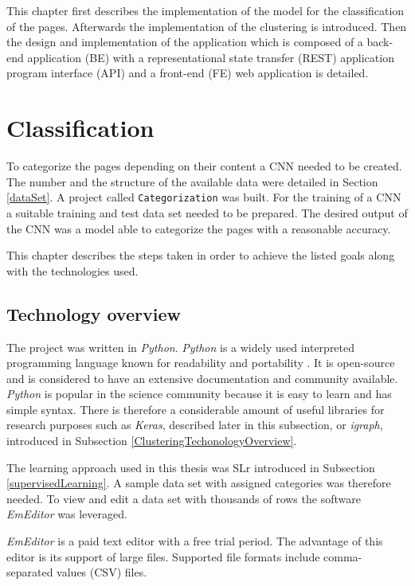 This chapter first describes the implementation of the model for the classification of the pages. Afterwards the implementation of the clustering is introduced. Then the design and implementation of the application which is composed of a back-end application (BE) with a representational state transfer (REST) application program interface (API) and a front-end (FE) web application is detailed. 

\section{Classification} \label{ClassificationDevelopment}
To categorize the pages depending on their content a CNN needed to be created. The number and the structure of the available data were detailed in Section \ref{dataSet}. A project called \texttt{Categorization} was built. For the training of a CNN a suitable training and test data set needed to be prepared. The desired output of the CNN was a model able to categorize the pages with a reasonable accuracy. 

This chapter describes the steps taken in order to achieve the listed goals along with the technologies used.

\subsection{Technology overview} \label{ClassificationTechonologyOverview}
The project was written in \textit{Python}. \textit{Python} is a widely used interpreted programming language known for readability and portability \cite{aboutPython}. It is open-source and is considered to have an extensive documentation and community available. \textit{Python} is popular in the science community because it is easy to learn and has simple syntax. There is therefore a considerable amount of useful libraries for research purposes such as \textit{Keras}, described later in this subsection, or \textit{igraph}, introduced in Subsection \ref{ClusteringTechonologyOverview}.  

The learning approach used in this thesis was SLr introduced in Subsection \ref{supervisedLearning}. A sample data set with assigned categories was therefore needed. To view and edit a data set with thousands of rows the software \textit{EmEditor} \cite{emeditor} was leveraged. 

\textit{EmEditor} is a paid text editor with a free trial period. The advantage of this editor is its support of large files. Supported file formats include comma-separated values (CSV) files. 

